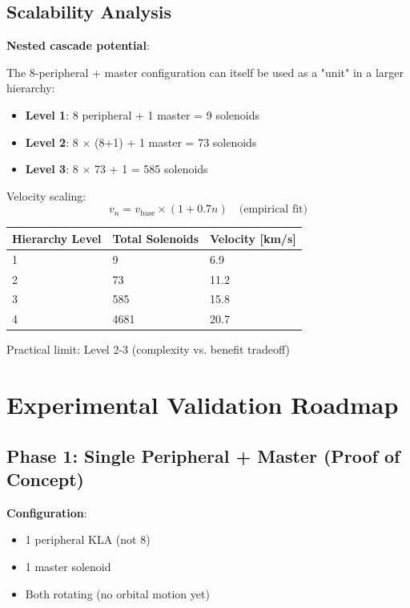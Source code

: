\documentclass[12pt,a4paper]{article}
\begin{document}
\subsection{Scalability Analysis}

\textbf{Nested cascade potential}:

The 8-peripheral + master configuration can itself be used as a "unit" in a larger hierarchy:

\begin{itemize}
\item \textbf{Level 1}: 8 peripheral + 1 master = 9 solenoids
\item \textbf{Level 2}: 8 × (8+1) + 1 master = 73 solenoids
\item \textbf{Level 3}: 8 × 73 + 1 = 585 solenoids
\end{itemize}

Velocity scaling:
\begin{equation}
v_{n} = v_{\text{base}} \times (1 + 0.7n) \quad \text{(empirical fit)}
\end{equation}

\begin{center}
\begin{tabular}{|l|l|l|}
\hline
\textbf{Hierarchy Level} & \textbf{Total Solenoids} & \textbf{Velocity [km/s]} \\
\hline
1 & 9 & 6.9 \\
2 & 73 & 11.2 \\
3 & 585 & 15.8 \\
4 & 4681 & 20.7 \\
\hline
\end{tabular}
\end{center}

Practical limit: Level 2-3 (complexity vs. benefit tradeoff)

\section{Experimental Validation Roadmap}

\subsection{Phase 1: Single Peripheral + Master (Proof of Concept)}

\textbf{Configuration}:
\begin{itemize}
\item 1 peripheral KLA (not 8)
\item 1 master solenoid
\item Both rotating (no orbital motion yet)
\end{itemize}
\end{document}
